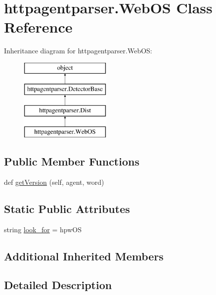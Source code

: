 \hypertarget{classhttpagentparser_1_1_web_o_s}{}\section{httpagentparser.\+Web\+OS Class Reference}
\label{classhttpagentparser_1_1_web_o_s}
Inheritance diagram for httpagentparser.\+Web\+OS\+:\begin{figure}[H]
\begin{center}
\leavevmode
\includegraphics[height=4.000000cm]{classhttpagentparser_1_1_web_o_s}
\end{center}
\end{figure}
\subsection*{Public Member Functions}
\begin{DoxyCompactItemize}
\item 
def \hyperlink{classhttpagentparser_1_1_web_o_s_a197ac4bbd116ff846b807b731c573b95}{get\+Version} (self, agent, word)
\end{DoxyCompactItemize}
\subsection*{Static Public Attributes}
\begin{DoxyCompactItemize}
\item 
string \hyperlink{classhttpagentparser_1_1_web_o_s_a5f837e1a8362d78c95518881cbd35d74}{look\+\_\+for} = \textquotesingle{}hpw\+OS\textquotesingle{}
\end{DoxyCompactItemize}
\subsection*{Additional Inherited Members}


\subsection{Detailed Description}


